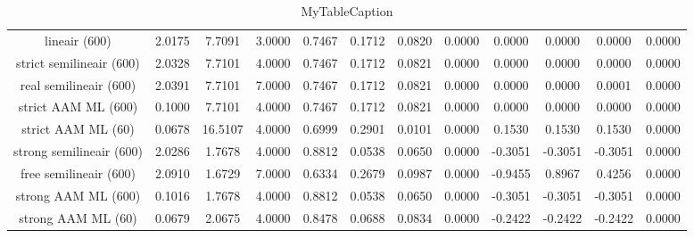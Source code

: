 \begin{table}
\centering
\begin{tabular}{|c|c|c|c|c|c|c|c|c|c|c|c|}
\hline
 &  &  &  &  &  &  &  &  &  &  &  \\
\hline
lineair (600) & 2.0175 & 7.7091 & 3.0000 & 0.7467 & 0.1712 & 0.0820 & 0.0000 & 0.0000 & 0.0000 & 0.0000 & 0.0000 \\
\hline
strict semilineair (600) & 2.0328 & 7.7101 & 4.0000 & 0.7467 & 0.1712 & 0.0821 & 0.0000 & 0.0000 & 0.0000 & 0.0000 & 0.0000 \\
\hline
real semilineair (600) & 2.0391 & 7.7101 & 7.0000 & 0.7467 & 0.1712 & 0.0821 & 0.0000 & 0.0000 & 0.0000 & 0.0001 & 0.0000 \\
\hline
strict AAM ML (600) & 0.1000 & 7.7101 & 4.0000 & 0.7467 & 0.1712 & 0.0821 & 0.0000 & 0.0000 & 0.0000 & 0.0000 & 0.0000 \\
\hline
strict AAM ML (60) & 0.0678 & 16.5107 & 4.0000 & 0.6999 & 0.2901 & 0.0101 & 0.0000 & 0.1530 & 0.1530 & 0.1530 & 0.0000 \\
\hline
strong semilineair (600) & 2.0286 & 1.7678 & 4.0000 & 0.8812 & 0.0538 & 0.0650 & 0.0000 & -0.3051 & -0.3051 & -0.3051 & 0.0000 \\
\hline
free semilineair (600) & 2.0910 & 1.6729 & 7.0000 & 0.6334 & 0.2679 & 0.0987 & 0.0000 & -0.9455 & 0.8967 & 0.4256 & 0.0000 \\
\hline
strong AAM ML (600) & 0.1016 & 1.7678 & 4.0000 & 0.8812 & 0.0538 & 0.0650 & 0.0000 & -0.3051 & -0.3051 & -0.3051 & 0.0000 \\
\hline
strong AAM ML (60) & 0.0679 & 2.0675 & 4.0000 & 0.8478 & 0.0688 & 0.0834 & 0.0000 & -0.2422 & -0.2422 & -0.2422 & 0.0000 \\
\hline
\end{tabular}
\caption{MyTableCaption}
\label{table:MyTableLabel}
\end{table}
